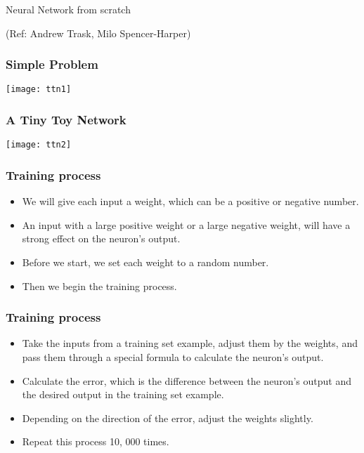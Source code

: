\begin{frame}
  \begin{center}
    {\Large Neural Network from scratch}
    
    (Ref: Andrew Trask, Milo Spencer-Harper)
  \end{center}
\end{frame}


\begin{frame}[fragile] \frametitle{Simple Problem}
\begin{center}
\texttt{[image: ttn1]}
\end{center}
\end{frame}

\begin{frame}[fragile] \frametitle{A Tiny Toy Network}
\begin{center}
\texttt{[image: ttn2]}
\end{center}
\end{frame}


\begin{frame}[fragile] \frametitle{Training process}
\begin{itemize}
\item We will give each input a weight, which can be a positive or negative number. 
\item An input with a large positive weight or a large negative weight, will have a strong effect on the neuron's output. 
\item Before we start, we set each weight to a random number. 
\item Then we begin the training process.

\end{itemize}
\end{frame}


\begin{frame}[fragile] \frametitle{Training process}
\begin{itemize}
\item Take the inputs from a training set example, adjust them by the weights, and pass them through a special formula to calculate the neuron's output.
\item Calculate the error, which is the difference between the neuron's output and the desired output in the training set example.
\item Depending on the direction of the error, adjust the weights slightly.
\item Repeat this process 10, 000 times.
\end{itemize}
\end{frame}


